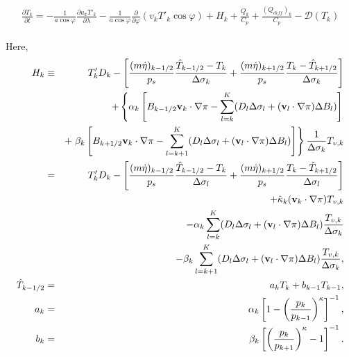 \begin{eqnarray}\begin{aligned}
  \frac{\partial T_k}{\partial t}
     =  - \frac{1}{a\cos\varphi}
               \frac{\partial u_k T'_k}{\partial \lambda}
          - \frac{1}{a\cos\varphi}
               \frac{\partial }{\partial \varphi} (v_k T'_k \cos\varphi)
          + H_k
        + \frac{Q_k}{C_{p}}
          + \frac{(Q_{diff})_k}{C_p}
          - {\mathcal D}(T_k)\end{aligned}\end{eqnarray}

Here, \begin{eqnarray}\begin{aligned}
   H_k
     &\equiv &  T_k' D_k
              - \left[   \frac{(m\dot{\eta})_{k-1/2}}{p_s} \frac{\hat{T}_{k-1/2} - T_k}{\Delta\sigma_k}
               + \frac{(m\dot{\eta})_{k+1/2}}{p_s} \frac{T_k - \hat{T}_{k+1/2}}{\Delta\sigma_k} \right] \notag\\
        &&+ \left\{ \alpha_k
                    \left[ B_{k-1/2} {\mathbf{v}}_k \cdot \nabla \pi
                          - \sum_{l=k}^{K}
                           (D_l \Delta \sigma_l + ({\mathbf{v}}_l \cdot \nabla \pi)\Delta B_l)
                    \right]
             \right. \notag\\
          &&+ \left. \beta_k
                     \left[ B_{k+1/2} {\mathbf{v}}_k \cdot \nabla \pi
                          - \sum_{l=k+1}^{K}
                           (D_l \Delta \sigma_l + ({\mathbf{v}}_l \cdot \nabla \pi)\Delta B_l)
                    \right]
              \right\}
              \frac{1}{\Delta \sigma_k} T_{v,k}\notag\\
     &= & T_k' D_k
          - \left[ \frac{(m\dot{\eta})_{k-1/2}}{p_s} \frac{\hat{T}_{k-1/2} - T_k}{\Delta \sigma_l}
               + \frac{(m\dot{\eta})_{k+1/2}}{p_s} \frac{T_k - \hat{T}_{k+1/2}}{\Delta \sigma_l} \right] \notag\\
        &&+ \hat{\kappa}_k ({\mathbf{v}}_k \cdot \nabla \pi) T_{v,k} \notag\\
        &&- \alpha_k \sum_{l=k}^{K}
                           (D_l \Delta \sigma_l + ({\mathbf{v}}_l \cdot \nabla \pi)\Delta B_l)
                            \frac{T_{v,k}}{\Delta \sigma_k} \notag\\
        &&- \beta_k \sum_{l=k+1}^{K}
                           (D_l \Delta \sigma_l + ({\mathbf{v}}_l \cdot \nabla \pi)\Delta B_l)
                            \frac{T_{v,k}}{\Delta \sigma_k}, \\
  \hat{T}_{k-1/2}
   &=& a_k T_k + b_{k-1} T_{k-1}, \\
  a_k  &=&  \alpha_k
              \left[ 1- \left( \frac{ p_k }{ p_{k-1} }
                        \right)^{\kappa} \right]^{-1},  \\
  b_k  &=&  \beta_k
              \left[ \left( \frac{ p_k }{ p_{k+1} }
                     \right)^{\kappa} - 1 \right]^{-1} .\end{aligned}\end{eqnarray}

